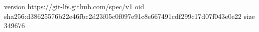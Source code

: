 version https://git-lfs.github.com/spec/v1
oid sha256:d38625576b22e46fbc2d23f05c0f097e91c8e667491cdf299c17d07f043e0e22
size 349676
